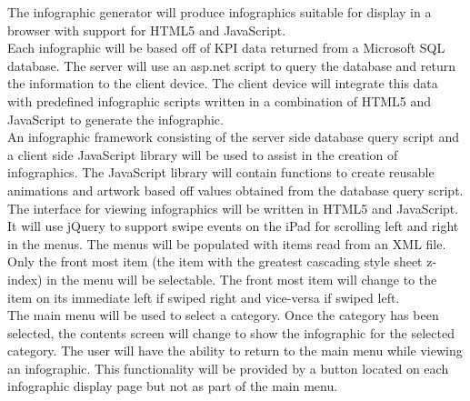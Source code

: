 \documentclass[11pt,a4paper,oneside]{article}
\begin{document}
The infographic generator will produce infographics suitable for display in a browser with support for HTML5 and JavaScript.\\


Each infographic will be based off of KPI data returned from a Microsoft SQL database.  The server will use an asp.net script to query the database and return the information to the client device.  The client device will integrate this data with predefined infographic scripts written in a combination of HTML5 and JavaScript to generate the infographic.\\


An infographic framework consisting of the server side database query script and a client side JavaScript library will be used to assist in the creation of infographics.  The JavaScript library will contain functions to create reusable animations and artwork based off values obtained from the database query script.\\


The interface for viewing infographics will be written in HTML5 and JavaScript.  It will use jQuery to support swipe events on the iPad for scrolling left and right in the menus.  The menus will be populated with items read from an XML file.  Only the front most item (the item with the greatest cascading style sheet z-index) in the menu will be selectable.  The front most item will change to the item on its immediate left if swiped right and vice-versa if swiped left.\\


The main menu will be used to select a category.  Once the category has been selected, the contents screen will change to show the infographic for the selected category.  The user will have the ability to return to the main menu while viewing an infographic.  This functionality will be provided by a button located on each infographic display page but not as part of the main menu.\\
\end{document}
